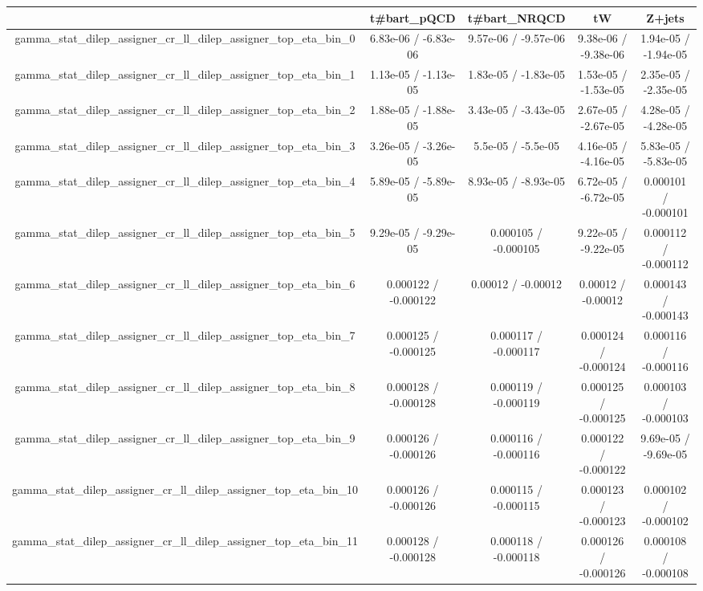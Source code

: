 \documentclass[10pt]{article}
\begin{document}
\begin{table}[htbp]
\begin{center}
\begin{tabular}{|c|c|c|c|c|}
\hline 
      & t#bar{t}_{pQCD}      & t#bar{t}_{NRQCD}      & tW      & Z+jets \\ 
\hline 
  gamma_stat_dilep_assigner_cr_ll_dilep_assigner_top_eta_bin_0 & 6.83e-06 / -6.83e-06 & 9.57e-06 / -9.57e-06 & 9.38e-06 / -9.38e-06 & 1.94e-05 / -1.94e-05 \\ 
  gamma_stat_dilep_assigner_cr_ll_dilep_assigner_top_eta_bin_1 & 1.13e-05 / -1.13e-05 & 1.83e-05 / -1.83e-05 & 1.53e-05 / -1.53e-05 & 2.35e-05 / -2.35e-05 \\ 
  gamma_stat_dilep_assigner_cr_ll_dilep_assigner_top_eta_bin_2 & 1.88e-05 / -1.88e-05 & 3.43e-05 / -3.43e-05 & 2.67e-05 / -2.67e-05 & 4.28e-05 / -4.28e-05 \\ 
  gamma_stat_dilep_assigner_cr_ll_dilep_assigner_top_eta_bin_3 & 3.26e-05 / -3.26e-05 & 5.5e-05 / -5.5e-05 & 4.16e-05 / -4.16e-05 & 5.83e-05 / -5.83e-05 \\ 
  gamma_stat_dilep_assigner_cr_ll_dilep_assigner_top_eta_bin_4 & 5.89e-05 / -5.89e-05 & 8.93e-05 / -8.93e-05 & 6.72e-05 / -6.72e-05 & 0.000101 / -0.000101 \\ 
  gamma_stat_dilep_assigner_cr_ll_dilep_assigner_top_eta_bin_5 & 9.29e-05 / -9.29e-05 & 0.000105 / -0.000105 & 9.22e-05 / -9.22e-05 & 0.000112 / -0.000112 \\ 
  gamma_stat_dilep_assigner_cr_ll_dilep_assigner_top_eta_bin_6 & 0.000122 / -0.000122 & 0.00012 / -0.00012 & 0.00012 / -0.00012 & 0.000143 / -0.000143 \\ 
  gamma_stat_dilep_assigner_cr_ll_dilep_assigner_top_eta_bin_7 & 0.000125 / -0.000125 & 0.000117 / -0.000117 & 0.000124 / -0.000124 & 0.000116 / -0.000116 \\ 
  gamma_stat_dilep_assigner_cr_ll_dilep_assigner_top_eta_bin_8 & 0.000128 / -0.000128 & 0.000119 / -0.000119 & 0.000125 / -0.000125 & 0.000103 / -0.000103 \\ 
  gamma_stat_dilep_assigner_cr_ll_dilep_assigner_top_eta_bin_9 & 0.000126 / -0.000126 & 0.000116 / -0.000116 & 0.000122 / -0.000122 & 9.69e-05 / -9.69e-05 \\ 
  gamma_stat_dilep_assigner_cr_ll_dilep_assigner_top_eta_bin_10 & 0.000126 / -0.000126 & 0.000115 / -0.000115 & 0.000123 / -0.000123 & 0.000102 / -0.000102 \\ 
  gamma_stat_dilep_assigner_cr_ll_dilep_assigner_top_eta_bin_11 & 0.000128 / -0.000128 & 0.000118 / -0.000118 & 0.000126 / -0.000126 & 0.000108 / -0.000108 \\ 

\end{tabular}
\end{center}
\end{table}
\end{document}
